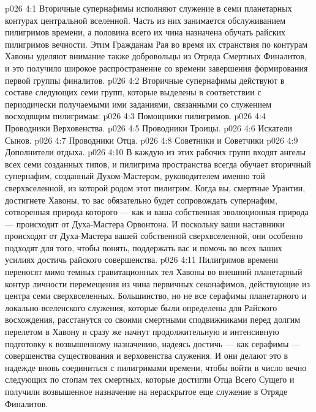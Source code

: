\vs p026 4:1 Вторичные супернафимы исполняют служение в семи планетарных контурах центральной вселенной. Часть из них занимается обслуживанием пилигримов времени, а половина всего их чина назначена обучать райских пилигримов вечности. Этим Гражданам Рая во время их странствия по контурам Хавоны уделяют внимание также добровольцы из Отряда Смертных Финалитов, и это получило широкое распространение со времени завершения формирования первой группы финалитов.
\vs p026 4:2 \pc Вторичные супернафимы действуют в составе следующих семи групп, которые выделены в соответствии с периодически получаемыми ими заданиями, связанными со служением восходящим пилигримам:
\vs p026 4:3 \bibnobreakspace Помощники пилигримов.
\vs p026 4:4 \bibnobreakspace Проводники Верховенства.
\vs p026 4:5 \bibnobreakspace Проводники Троицы.
\vs p026 4:6 \bibnobreakspace Искатели Сынов.
\vs p026 4:7 \bibnobreakspace Проводники Отца.
\vs p026 4:8 \bibnobreakspace Советники и Советчики
\vs p026 4:9 \bibnobreakspace Дополнители отдыха.
\vs p026 4:10 \pc В каждую из этих рабочих групп входят ангелы всех семи созданных типов, и пилигрима пространства всегда обучает вторичный супернафим, созданный Духом\hyp{}Мастером, руководителем именно той сверхвселенной, из которой родом этот пилигрим. Когда вы, смертные Урантии, достигнете Хавоны, то вас обязательно будет сопровождать супернафим, сотворенная природа которого --- как и ваша собственная эволюционная природа --- происходит от Духа\hyp{}Мастера Орвонтона. И поскольку ваши наставники происходят от Духа\hyp{}Мастера вашей собственной сверхвселенной, они особенно подходят для того, чтобы понять, поддержать вас и помочь во всех ваших усилиях достичь райского совершенства.
\vs p026 4:11 Пилигримов времени переносят мимо темных гравитационных тел Хавоны во внешний планетарный контур личности перемещения из чина первичных секонафимов, действующие из центра семи сверхвселенных. Большинство, но не все серафимы планетарного и локально\hyp{}вселенского служения, которые были определены для Райского восхождения, расстанутся со своими смертными сподвижниками перед долгим перелетом в Хавону и сразу же начнут продолжительную и интенсивную подготовку к возвышенному назначению, надеясь достичь --- как серафимы --- совершенства существования и верховенства служения. И они делают это в надежде вновь соединиться с пилигримами времени, чтобы войти в число вечно следующих по стопам тех смертных, которые достигли Отца Всего Сущего и получили возвышенное назначение на нераскрытое еще служение в Отряде Финалитов.
